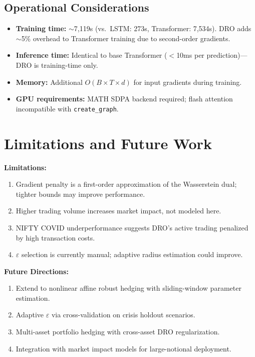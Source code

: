 \documentclass[11pt]{article}
\begin{document}
\subsection{Operational Considerations}

\begin{itemize}[noitemsep]
    \item \textbf{Training time:} $\sim$7,119s (vs.\ LSTM: 273s, Transformer: 7,534s). DRO adds $\sim$5\% overhead to Transformer training due to second-order gradients.
    \item \textbf{Inference time:} Identical to base Transformer ($<$10ms per prediction)---DRO is training-time only.
    \item \textbf{Memory:} Additional $O(B \times T \times d)$ for input gradients during training.
    \item \textbf{GPU requirements:} MATH SDPA backend required; flash attention incompatible with \texttt{create\_graph}.
\end{itemize}

\section{Limitations and Future Work}

\textbf{Limitations:}
\begin{enumerate}[noitemsep,leftmargin=*]
    \item Gradient penalty is a first-order approximation of the Wasserstein dual; tighter bounds may improve performance.
    \item Higher trading volume increases market impact, not modeled here.
    \item NIFTY COVID underperformance suggests DRO's active trading penalized by high transaction costs.
    \item $\varepsilon$ selection is currently manual; adaptive radius estimation could improve.
\end{enumerate}

\textbf{Future Directions:}
\begin{enumerate}[noitemsep,leftmargin=*]
    \item Extend to nonlinear affine robust hedging with sliding-window parameter estimation.
    \item Adaptive $\varepsilon$ via cross-validation on crisis holdout scenarios.
    \item Multi-asset portfolio hedging with cross-asset DRO regularization.
    \item Integration with market impact models for large-notional deployment.
\end{enumerate}
\end{document}
